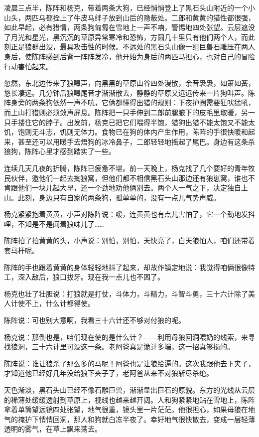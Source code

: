 \par 凌晨三点半，陈阵和杨克，带着两条大狗，已经悄悄登上了黑石头山附近的一个小山头，两匹马都拴上了牛皮马绊子放到山后的隐蔽处。二郎和黄黄的猎性都很强，如此早起，必有猎情，两条狗匍匐在雪地上一声不响，警惕地四处张望。云层遮没了月光和星光，黑沉沉的草原异常寒冷和恐怖，方圆几十里只有他们两个人，而此刻正是狼群出没，最具攻击性的时候。不远处的黑石头山像一组巨兽石雕压在两人身后，使陈阵感到后背一阵阵发冷，他开始为身后的两匹马担心，也对自己的冒险行动害怕起来。
\par 忽然，东北边传来了狼嗥声，向黑黑的草原山谷四处漫散，余音袅袅，如箫如簧，悠长凄远。几分钟后狼嗥尾音才渐渐散去，静静的草原又远远传来一片狗叫声。陈阵身旁的两条狗依然一声不吭，它俩都懂得出猎的规则：下夜护圈需要狂吠猛吼，而上山打猎则必须敛声屏息。陈阵把一只手伸到二郎前腿腋下的皮毛里取暖，另一只手搂住它的脖子。出发前，杨克已把它们喂得半饱，猎狗出猎不能太饱又不能太饥，饱则无斗志，饥则无体力。食物已在狗的体内产生作用，陈阵的手很快暖和起来，甚至还可以用暖手去焐狗的冰冷鼻子，二郎轻轻地摇起了尾巴。身边有这条杀狼狗，陈阵心里才感到踏实了一些。
\par 连续几天几夜的折腾，陈阵已疲惫不堪。前一天晚上，杨克找了几个要好的青年牧民伙伴，邀他们一起去掏狼窝，但他们都不相信黑石头山那边还有狼崽窝，谁也不肯跟他们一块儿起大早，还一个劲地劝他俩别去。两个人一气之下，决定独自上山。此刻，身边只有自家的两条狗，孤单单的，没有一点儿气势声威。
\par 杨克紧紧抱着黄黄，小声对陈阵说：嗳，连黄黄也有点儿害怕了，它一个劲地发抖哩，不知是不是闻着狼味儿了……
\par 陈阵拍了拍黄黄的头，小声说：别怕，别怕，天快亮了，白天狼怕人，咱们还带着套马杆呢。
\par 陈阵的手也跟着黄黄的身体轻轻地抖了起来，却故作镇定地说：我觉得咱俩很像特工，深入敌后，狼口拔牙。现在我一点儿也不困了。
\par 杨克也壮了壮胆说：打狼就是打仗，斗体力，斗精力，斗智斗勇，三十六计除了美人计使不上，什么计都得使。
\par 陈阵说：可也别大意啊，我看三十六计还不够对付狼的呢。
\par 杨克说：那倒也是，咱们现在使的是什么计？——利用母狼回洞喂奶的线索，来寻找狼洞，三十六计里可没这一条。老阿爸真是诡计多端，这一招真够损的。
\par 陈阵说：谁让狼杀了那么多的马呢！阿爸也是让狼给逼的。这次我跟他去下夹子，才知道他已经好几年没给狼下夹子了，老阿爸从来不对狼斩尽杀绝。
\par 天色渐淡，黑石头山已经不像石雕巨兽，渐渐显出巨石的原貌。东方的光线从云层的稀薄处缓缓透射到草原上，视线也越来越开阔。人和狗紧紧地贴在雪地上，陈阵拿着单筒望远镜四处张望，地气很重，镜头里一片茫茫。他很担心，如果母狼在地气的掩护下悄悄回洞，那人和狗就白冻半夜了。幸好地气很快散去，变成一层轻薄透明的雾气，在草上飘来荡去。

